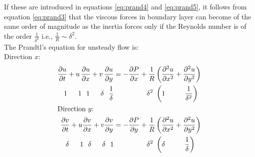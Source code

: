 \documentclass[../main-sheet.tex]{subfiles}
\begin{document}
\begin{soln}
    If these are introduced in equations \eqref{eq:prand4} and \eqref{eq:prand5}, it follows from equation \eqref{eq:prand3} that the viscous forces in boundary layer can become of the same order of magnitude as the inertia forces only if the Reynolds number is of the order \(\frac{1}{\delta^2}\) i.e., \(\frac{1}{R }\sim \delta^2\).\\
    The Prandtl's equation for unsteady flow is:\\
    Direction \(x \):
    \begin{align*}
        \frac{\partial u}{\partial t}+u\,\frac{\partial u}{\partial x }+v\,\frac{\partial u}{\partial y }&=-\frac{\partial P}{\partial x }+\frac{1}{R}\left( \frac{\partial^2 u }{\partial x^2}+\frac{\partial^2 u }{\partial y^2}\right) \\
        1\phantom{++}1\,\,\,\,1\phantom{++}\delta\,\,\,\,\frac{1}{\delta}&\phantom{=-\frac{\partial P}{\partial x }+\,\,\,}\delta^2\,\,\left( 1\phantom{+++}\frac{1}{\delta^2}\right) \\
        \intertext{Direction \(y\):}
        \frac{\partial v}{\partial t }+u\frac{\partial v}{\partial x }+v\frac{\partial v}{\partial y }&=-\frac{\partial P}{\partial y }+
        \frac{1}{R}\left( \frac{\partial^2 u }{\partial x^2}+\frac{\partial^2 u }{\partial y^2}\right) \\
        \delta\phantom{++}1\,\,\,\,\delta\phantom{++}\delta\,\,\,\,1&\phantom{=-\frac{\partial P}{\partial x }+\,\,\,}\delta^2\,\,\left( \delta\phantom{+++}\frac{1}{\delta}\right) \\

\end{align*}
\end{soln}
\end{document}
